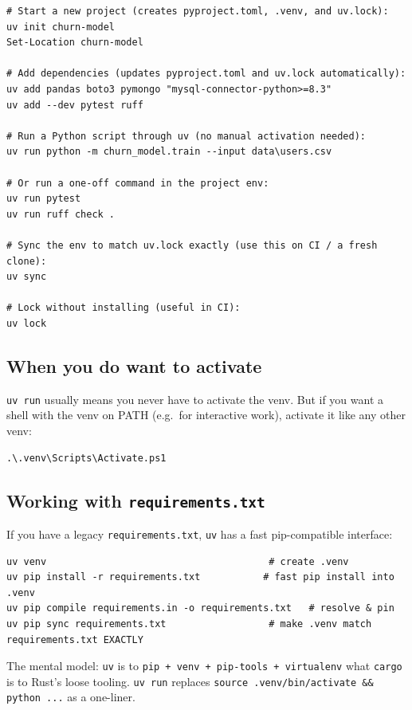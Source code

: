 \documentclass[11pt,a4paper]{article}
\begin{document}
\begin{lstlisting}[style=pwshstyle]
# Start a new project (creates pyproject.toml, .venv, and uv.lock):
uv init churn-model
Set-Location churn-model

# Add dependencies (updates pyproject.toml and uv.lock automatically):
uv add pandas boto3 pymongo "mysql-connector-python>=8.3"
uv add --dev pytest ruff

# Run a Python script through uv (no manual activation needed):
uv run python -m churn_model.train --input data\users.csv

# Or run a one-off command in the project env:
uv run pytest
uv run ruff check .

# Sync the env to match uv.lock exactly (use this on CI / a fresh clone):
uv sync

# Lock without installing (useful in CI):
uv lock
\end{lstlisting}

\subsection*{When you do want to activate}

\texttt{uv run} usually means you never have to activate the venv.
But if you want a shell with the venv on PATH (e.g.\ for interactive
work), activate it like any other venv:

\begin{lstlisting}[style=pwshstyle]
.\.venv\Scripts\Activate.ps1
\end{lstlisting}

\subsection*{Working with \texttt{requirements.txt}}

If you have a legacy \texttt{requirements.txt}, \texttt{uv} has a fast
pip-compatible interface:

\begin{lstlisting}[style=pwshstyle]
uv venv                                       # create .venv
uv pip install -r requirements.txt           # fast pip install into .venv
uv pip compile requirements.in -o requirements.txt   # resolve & pin
uv pip sync requirements.txt                  # make .venv match requirements.txt EXACTLY
\end{lstlisting}

\begin{compare}
The mental model: \texttt{uv} is to \texttt{pip + venv + pip-tools +
virtualenv} what \texttt{cargo} is to Rust's loose tooling. \texttt{uv
run} replaces \texttt{source .venv/bin/activate \&\& python ...} as a
one-liner.
\end{compare}
\end{document}
